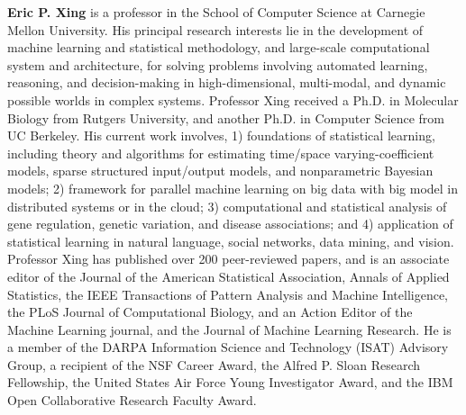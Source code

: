 \begin{bio}
\textbf{Eric P. Xing} is a professor in the School of
Computer Science at Carnegie Mellon University. His principal research interests lie in the development
of machine learning and statistical methodology,
and large-scale computational system and
architecture, for solving problems involving automated
learning, reasoning, and decision-making
in high-dimensional, multi-modal, and dynamic
possible worlds in complex systems. Professor
Xing received a Ph.D. in Molecular Biology from
Rutgers University, and another Ph.D. in Computer
Science from UC Berkeley. His current
work involves, 1) foundations of statistical learning,
including theory and algorithms for estimating
time/space varying-coefficient models, sparse
structured input/output models, and nonparametric
Bayesian models; 2) framework for parallel
machine learning on big data with big model in
distributed systems or in the cloud; 3) computational
and statistical analysis of gene regulation,
genetic variation, and disease associations;
and 4) application of statistical learning in natural
language, social networks, data mining, and
vision. Professor Xing has published over 200
peer-reviewed papers, and is an associate editor
of the Journal of the American Statistical Association,
Annals of Applied Statistics, the IEEE Transactions
of Pattern Analysis and Machine Intelligence, the PLoS Journal of Computational Biology,
and an Action Editor of the Machine Learning
journal, and the Journal of Machine Learning
Research. He is a member of the DARPA Information
Science and Technology (ISAT) Advisory
Group, a recipient of the NSF Career Award, the
Alfred P. Sloan Research Fellowship, the United
States Air Force Young Investigator Award, and
the IBM Open Collaborative Research Faculty
Award. 
\end{bio}

